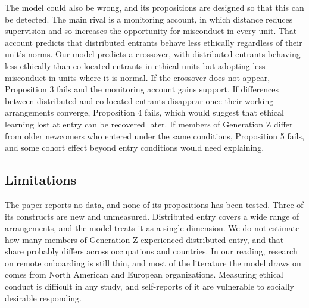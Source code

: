 The model could also be wrong, and its propositions are designed so that this can be detected. The main rival is a monitoring account, in which distance reduces supervision and so increases the opportunity for misconduct in every unit. That account predicts that distributed entrants behave less ethically regardless of their unit's norms. Our model predicts a crossover, with distributed entrants behaving less ethically than co-located entrants in ethical units but adopting less misconduct in units where it is normal. If the crossover does not appear, Proposition 3 fails and the monitoring account gains support. If differences between distributed and co-located entrants disappear once their working arrangements converge, Proposition 4 fails, which would suggest that ethical learning lost at entry can be recovered later. If members of Generation Z differ from older newcomers who entered under the same conditions, Proposition 5 fails, and some cohort effect beyond entry conditions would need explaining.

\subsection{Limitations}

The paper reports no data, and none of its propositions has been tested. Three of its constructs are new and unmeasured. Distributed entry covers a wide range of arrangements, and the model treats it as a single dimension. We do not estimate how many members of Generation Z experienced distributed entry, and that share probably differs across occupations and countries. In our reading, research on remote onboarding is still thin, and most of the literature the model draws on comes from North American and European organizations. Measuring ethical conduct is difficult in any study, and self-reports of it are vulnerable to socially desirable responding.
